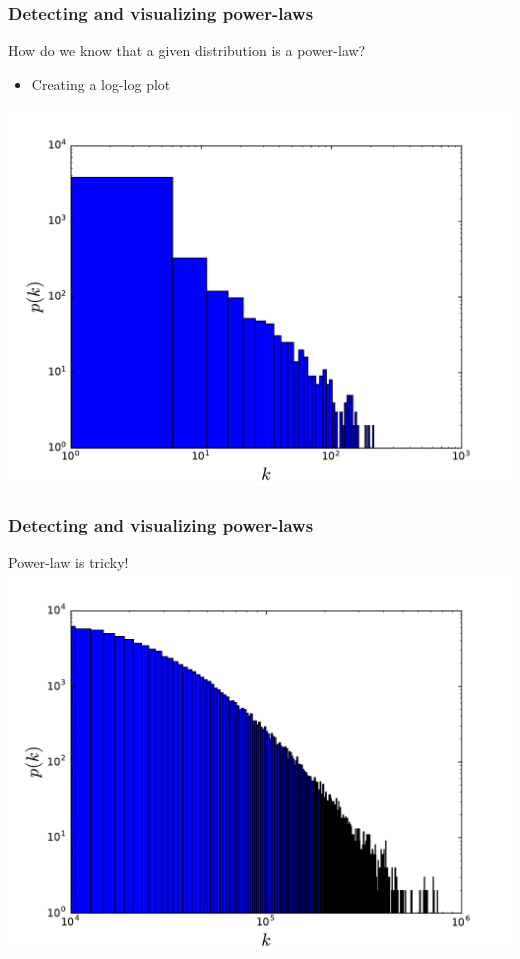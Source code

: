 \documentclass{beamer}
\begin{document}
\begin{frame}
    \frametitle{Detecting and visualizing power-laws}
    \centering
    How do we know that a given distribution is a power-law?
    \begin{itemize}
    \setlength\itemsep{1em}
        \item{Creating a log-log plot}
    \end{itemize}
    \includegraphics[width=0.8\columnwidth]{deg_distri_global_airport_log.pdf}
\end{frame}
\begin{frame}
    \frametitle{Detecting and visualizing power-laws}
    \centering
    Power-law is tricky!
    \includegraphics[width=0.8\columnwidth]{lognormal.pdf}
\end{frame}
\end{document}
